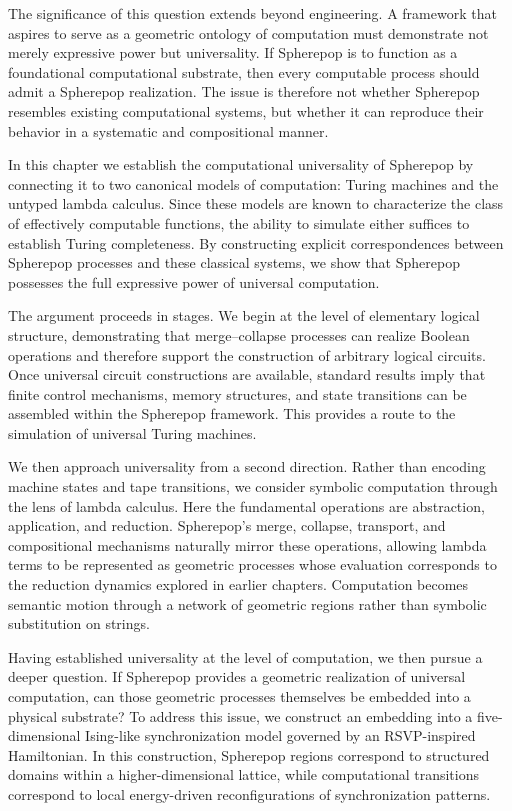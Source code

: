 \documentclass[12pt,letterpaper]{article}
\theoremstyle{remark}
\begin{document}
The significance of this question extends beyond engineering. A framework that aspires to serve as a geometric ontology of computation must demonstrate not merely expressive power but universality. If Spherepop is to function as a foundational computational substrate, then every computable process should admit a Spherepop realization. The issue is therefore not whether Spherepop resembles existing computational systems, but whether it can reproduce their behavior in a systematic and compositional manner.

In this chapter we establish the computational universality of Spherepop by connecting it to two canonical models of computation: Turing machines and the untyped lambda calculus. Since these models are known to characterize the class of effectively computable functions, the ability to simulate either suffices to establish Turing completeness. By constructing explicit correspondences between Spherepop processes and these classical systems, we show that Spherepop possesses the full expressive power of universal computation.

The argument proceeds in stages. We begin at the level of elementary logical structure, demonstrating that merge--collapse processes can realize Boolean operations and therefore support the construction of arbitrary logical circuits. Once universal circuit constructions are available, standard results imply that finite control mechanisms, memory structures, and state transitions can be assembled within the Spherepop framework. This provides a route to the simulation of universal Turing machines.

We then approach universality from a second direction. Rather than encoding machine states and tape transitions, we consider symbolic computation through the lens of lambda calculus. Here the fundamental operations are abstraction, application, and reduction. Spherepop's merge, collapse, transport, and compositional mechanisms naturally mirror these operations, allowing lambda terms to be represented as geometric processes whose evaluation corresponds to the reduction dynamics explored in earlier chapters. Computation becomes semantic motion through a network of geometric regions rather than symbolic substitution on strings.

Having established universality at the level of computation, we then pursue a deeper question. If Spherepop provides a geometric realization of universal computation, can those geometric processes themselves be embedded into a physical substrate? To address this issue, we construct an embedding into a five-dimensional Ising-like synchronization model governed by an RSVP-inspired Hamiltonian. In this construction, Spherepop regions correspond to structured domains within a higher-dimensional lattice, while computational transitions correspond to local energy-driven reconfigurations of synchronization patterns.
\end{document}
